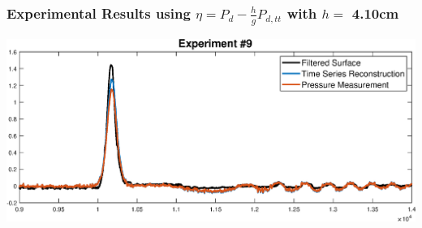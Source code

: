 \begin{frame}[t]\frametitle{Experimental Results using \(\eta = P_d - \frac{h}{g}P_{d,tt}\) with \(h = \) 4.10cm}
	\includegraphics[width=\textwidth]{images/Exp_num_9.eps}
\end{frame}


